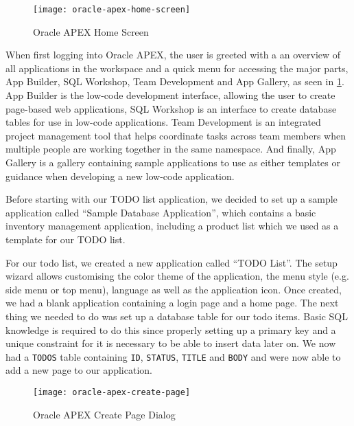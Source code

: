 \documentclass[runningheads]{llncs}
\begin{document}
\begin{figure}
  \centering
  \texttt{[image: oracle-apex-home-screen]}
  \caption{Oracle APEX Home Screen}
  \label{fig:oracle_apex_home_screen}
\end{figure}

When first logging into Oracle APEX, the user is greeted with a an overview of all applications in the workspace and a quick menu for accessing the major parts, App Builder, SQL Workshop, Team Development and App Gallery, as seen in \cref{fig:oracle_apex_home_screen}. App Builder is the low-code development interface, allowing the user to create page-based web applications, SQL Workshop is an interface to create database tables for use in low-code applications. Team Development is an integrated project management tool that helps coordinate tasks across team members when multiple people are working together in the same namespace. And finally, App Gallery is a gallery containing sample applications to use as either templates or guidance when developing a new low-code application.

Before starting with our TODO list application, we decided to set up a sample application called “Sample Database Application”, which contains a basic inventory management application, including a product list which we used as a template for our TODO list.

For our todo list, we created a new application called “TODO List”. The setup wizard allows customising the color theme of the application, the menu style (e.g. side menu or top menu), language as well as the application icon. Once created, we had a blank application containing a login page and a home page. The next thing we needed to do was set up a database table for our todo items. Basic SQL knowledge is required to do this since properly setting up a primary key and a unique constraint for it is necessary to be able to insert data later on. We now had a \texttt{TODOS} table containing \texttt{ID}, \texttt{STATUS}, \texttt{TITLE} and \texttt{BODY} and were now able to add a new page to our application.

\begin{figure}
  \centering
  \texttt{[image: oracle-apex-create-page]}
  \caption{Oracle APEX Create Page Dialog}
  \label{fig:oracle_apex_create_page}
\end{figure}
\end{document}
